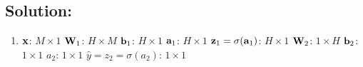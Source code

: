 \documentclass[submit]{harvardml}
\begin{document}
\subsection*{Solution:}
\begin{enumerate}
    \item 
    $\mathbf{x}$: $M \times 1$\newline
    $\mathbf{W}_{1}$: $H \times M$\newline
    $\mathbf{b}_{1}$: $H \times 1$\newline
    $\mathbf{a}_{1}$: $H \times 1$\newline
    $\mathbf{z}_{1} = \sigma(\mathbf{a}_1)$: $H \times 1$\newline
    $\mathbf{W}_{2}$: $1 \times H$\newline
    $\mathbf{b}_{2}$: $1 \times 1$\newline
    $a_{2}$: $1 \times 1$\newline
    $\hat{y} = z_2 = \sigma(a_2)$: $1 \times 1$
    

\end{enumerate}
\end{document}
